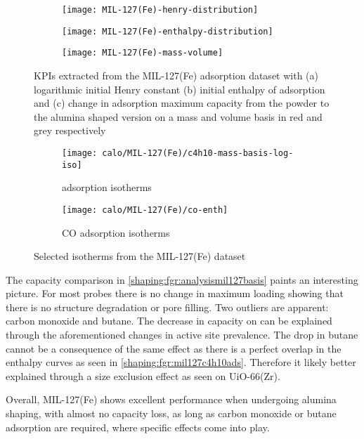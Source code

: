 \begin{figure}[p!]
	\centering
	\begin{subfigure}{\linewidth}
		\parbox[c]{0.1\linewidth}{\caption{}%
			\label{shaping:fgr:analysismil127henry}}%
		\parbox[b]{0.8\linewidth}{%
			\texttt{[image: MIL-127(Fe)-henry-distribution]}%
		}%
	\end{subfigure}

	\begin{subfigure}{\linewidth}
		\parbox[c]{0.1\linewidth}{\caption{}%
			\label{shaping:fgr:analysismil127enth}}%
		\parbox[b]{0.8\linewidth}{%
			\texttt{[image: MIL-127(Fe)-enthalpy-distribution]}%
		}%
	\end{subfigure}

	\begin{subfigure}{\linewidth}
		\parbox[c]{0.1\linewidth}{\caption{}%
			\label{shaping:fgr:analysismil127basis}}%
		\parbox[b]{0.8\linewidth}{%
			\texttt{[image: MIL-127(Fe)-mass-volume]}%
		}%
	\end{subfigure}

	\caption{KPIs extracted from the MIL-127(Fe) adsorption dataset with
		(a) logarithmic initial Henry constant (b) initial enthalpy of
        adsorption and (c) change in adsorption maximum capacity from 
        the powder to the alumina shaped version on a mass and volume 
        basis in red and grey respectively}%
	\label{shaping:fgr:analysismil127}
\end{figure}

\begin{figure}[!htb]
	\centering
	\begin{subfigure}{0.45\textwidth}
		\texttt{[image: calo/MIL-127(Fe)/c4h10-mass-basis-log-iso]}
		\caption{ adsorption isotherms}%
		\label{shaping:fgr:mil127c4h10ads}
	\end{subfigure}
	\begin{subfigure}{0.45\textwidth}
		\texttt{[image: calo/MIL-127(Fe)/co-enth]}
		\caption{CO adsorption isotherms}%
		\label{shaping:fgr:mil127coads}
	\end{subfigure}%
	\caption{Selected isotherms from the MIL-127(Fe) dataset}%
	\label{shaping:fgr:mil127isotherms}
\end{figure}

The capacity comparison in \autoref{shaping:fgr:analysismil127basis}
paints an interesting picture. For most probes there is no change in
maximum loading showing that there is no structure degradation or
pore filling. Two outliers are apparent: carbon monoxide and
butane. The decrease in capacity on  can be explained through the
aforementioned changes in active site prevalence.
The drop in butane cannot be a consequence of the same effect
as there is a perfect overlap in the enthalpy curves as seen in
\autoref{shaping:fgr:mil127c4h10ads}.
Therefore it likely better explained through a size exclusion
effect as seen on UiO-66(Zr).

Overall, MIL-127(Fe) shows excellent performance when undergoing
alumina shaping, with almost no capacity loss, as long as
carbon monoxide or butane adsorption are required, where specific effects
come into play.

